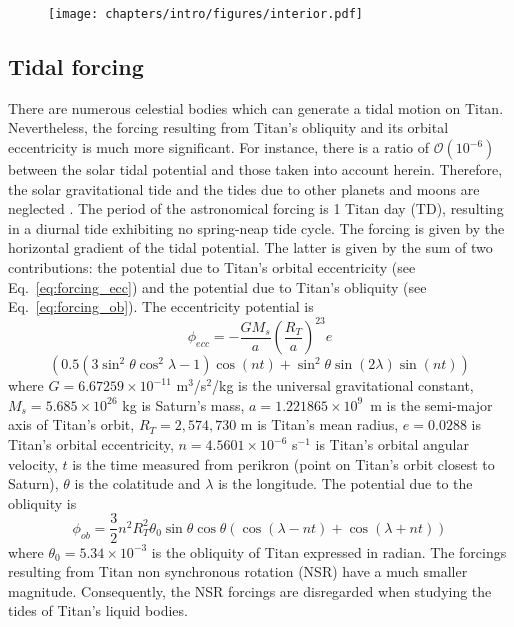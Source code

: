\begin{figure}
\begin{center}
\texttt{[image: chapters/intro/figures/interior.pdf]}
\end{center}
\vspace{-0.5cm}
\end{figure}

\subsection{Tidal forcing}
\label{sec:intro:forcing}
There are numerous celestial bodies which can generate a tidal motion on Titan. Nevertheless, the forcing resulting from Titan's obliquity and its orbital eccentricity is much more significant. For instance, there is a ratio of $\mathcal{O}(10^{-6})$ between the solar tidal potential and those taken into account herein. Therefore, the solar gravitational tide and the tides due to other planets and moons are neglected \citep{sagan1982tide}. The period of the astronomical forcing is 1 Titan day (TD), resulting in a diurnal tide exhibiting no spring-neap tide cycle. The forcing is given by the horizontal gradient of the tidal potential. The latter is given by the sum of two contributions: the potential due to Titan's orbital eccentricity (see Eq.~\ref{eq:forcing_ecc}) and the potential due to Titan's obliquity (see Eq.~\ref{eq:forcing_ob}). The eccentricity potential is \citep{dermott1995tidal}
\begin{equation*}
\phi_{ecc} = -\frac{GM_s}{a} \left(\frac{R_T}{a}\right)^23e
\end{equation*}
\begin{equation}
\left(0.5(3\sin^2\theta\cos^2\lambda-1)\cos(nt)+\sin^2\theta\sin(2\lambda)\sin(nt)\right)
\label{eq:forcing_ecc}
\end{equation}
where $G=6.67259\times10^{-11}$ m$^3$/s$^{2}$/kg is the universal gravitational constant, $M_s=5.685\times10^{26}$ kg is Saturn's mass, $a=1.221865\times10^9$~m is the semi-major axis of Titan's orbit, $R_T=2,574,730$ m is Titan's mean radius, $e=0.0288$ is Titan's orbital eccentricity, $n=4.5601\times10^{-6}$ s$^{-1}$ is Titan's orbital angular velocity, $t$ is the time measured from perikron (point on Titan's orbit closest to Saturn), $\theta$ is the colatitude and $\lambda$ is the longitude. The potential due to the obliquity is \citep{tyler2008strong}
\begin{equation}
\phi_{ob} = \frac{3}{2}n^2R_T^2\theta_0\sin\theta\cos\theta\left(\cos(\lambda-nt)+\cos(\lambda+nt)\right)
\label{eq:forcing_ob}
\end{equation}
where $\theta_0=5.34\times10^{-3}$ is the obliquity of Titan expressed in radian. The forcings resulting from Titan non synchronous rotation (NSR) have a much smaller magnitude. Consequently, the NSR forcings are disregarded when studying the tides of Titan's liquid bodies.

